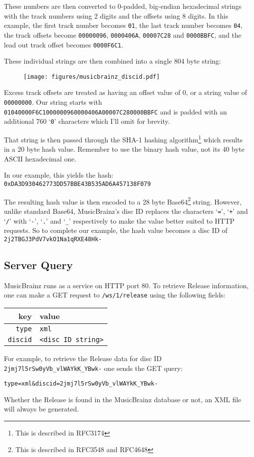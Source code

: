 These numbers are then converted to 0-padded, big-endian hexadecimal strings
with the track numbers using 2 digits and the offsets using 8 digits.
In this example, the first track number becomes \texttt{01},
the last track number becomes \texttt{04},
the track offsets become \texttt{00000096}, \texttt{0000406A},
\texttt{00007C28} and \texttt{0000BBFC},
and the lead out track offset becomes \texttt{0000F6C1}.

These individual strings are then combined into a single 804 byte string:
\begin{figure}[h]
\texttt{[image: figures/musicbrainz\_discid.pdf]}
\end{figure}

Excess track offsets are treated as having an offset value of 0,
or a string value of \texttt{00000000}.
Our string starts with \texttt{01040000F6C1000000960000406A00007C280000BBFC}
and is padded with an additional 760 `\texttt{0}' characters
which I'll omit for brevity.

That string is then passed through the SHA-1 hashing algorithm\footnote{This is described in RFC3174}
which results in a 20 byte hash value.
Remember to use the binary hash value, not its 40 byte ASCII hexadecimal one.

In our example, this yields the hash:
\texttt{0xDA3D930462773DD57BBE43B535AD6A457138F079}

The resulting hash value is then encoded to a 28 byte Base64\footnote{This is described in RFC3548 and RFC4648} string.
However, unlike standard Base64, MusicBrainz's disc ID replaces the
characters `\texttt{=}', `\texttt{+}' and `\texttt{/}' with `\texttt{-}', `\texttt{.}' and `\texttt{\_}' respectively to
make the value better suited to HTTP requests.
So to complete our example, the hash value becomes a disc ID of
\texttt{2j2TBGJ3PdV7vkO1Na1qRXE48Hk-}

\pagebreak

\subsection{Server Query}
MusicBrainz runs as a service on HTTP port 80.
To retrieve Release information, one can make a GET request to
\texttt{/ws/1/release} using the following fields:
\begin{table}[h]
\begin{tabular}{|r|l|}
\hline
key & value \\
\hline
\texttt{type} & \texttt{xml} \\
\texttt{discid} & \texttt{<disc ID string>} \\
\hline
\end{tabular}
\end{table}
\par
\noindent
For example, to retrieve the Release data for disc ID
\texttt{2jmj7l5rSw0yVb\_vlWAYkK\_YBwk-} one sends the GET query:
\begin{Verbatim}[frame=single]
type=xml&discid=2jmj7l5rSw0yVb_vlWAYkK_YBwk-
\end{Verbatim}
Whether the Release is found in the MusicBrainz database or not,
an XML file will always be generated.

